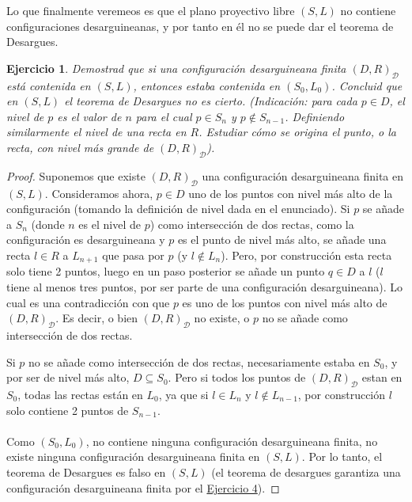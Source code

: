 \documentclass[12pt,a4paper]{article}
\newcommand{\D}{\mathcal{D}}
\theoremstyle{break}
\newtheorem{ej}{Ejercicio}
\newtheorem*{proof}{Solución}
\begin{document}
\noindent Lo que finalmente veremeos es que el plano proyectivo libre $(S,L)$ no
contiene configuraciones desarguineanas, y por tanto en \'el no se puede dar el teorema
de Desargues.

\begin{ej}\label{ej:5}
	Demostrad que si una configuración desarguineana finita $(D,R)_\D$ está
	contenida en $(S,L)$, entonces estaba contenida en $(S_0,L_0)$. Concluid
	que en $(S,L)$ el teorema de Desargues no es cierto. (\emph{Indicación:}
	para cada $p \in D$, el nivel de $p$ es el valor de $n$ para el cual
	$p \in S_n$ y $p \notin S_{n-1}$. Definiendo similarmente el nivel de una recta
	en $R$. Estudiar cómo se origina el punto, o la recta, con nivel más grande
	de $(D,R)_\D$).
\end{ej}
\begin{proof}
	Suponemos que existe $(D,R)_\D$ una configuración desarguineana finita en
	$(S,L)$. Consideramos ahora, $p \in D$ uno de los puntos con nivel más alto de
	la configuración (tomando la definición de nivel dada en el enunciado). Si $p$
	se añade a $S_n$ (donde $n$ es el nivel de $p$) como intersección de dos
	rectas, como la configuración es desarguineana y $p$ es el punto de nivel más
	alto, se añade una recta $l \in R$ a $L_{n+1}$ que pasa por $p$ (y
	$l \notin L_n$). Pero, por construcción esta recta solo tiene 2 puntos, luego
	en un paso posterior se añade un punto $q \in D$ a $l$ ($l$ tiene al menos tres
	puntos, por ser parte de una configuración desarguineana). Lo cual es una
	contradicción con que $p$ es uno de los puntos con nivel más alto de
	$(D,R)_\D$. Es decir, o bien $(D,R)_\D$ no existe, o $p$ no se añade como 
	intersección de dos rectas.
	
	Si $p$ no se añade como intersección de dos rectas, necesariamente estaba en
	$S_0$, y por ser de nivel más alto, $D \subseteq S_0$. Pero si todos los puntos
	de $(D,R)_\D$ estan en $S_0$, todas las rectas están en $L_0$, ya que si
	$l \in L_n$ y $l \notin L_{n-1}$, por construcción $l$ solo contiene 2 puntos
	de $S_{n-1}$.
	\\ \\
	\noindent Como $(S_0,L_0)$, no contiene ninguna configuración desarguineana
	finita, no existe ninguna configuración desarguineana finita en $(S,L)$. Por
	lo tanto, el teorema de Desargues es falso en $(S,L)$ (el teorema de desargues
	garantiza una configuración desarguineana finita por el
	\hyperref[ej:4]{Ejercicio 4}).
\end{proof}
\end{document}

